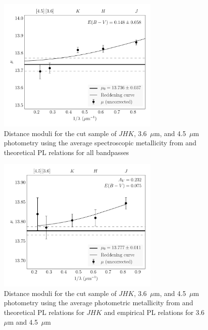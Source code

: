\documentclass[a4paper,fleqn,usenatbib]{mnras}
\begin{document}
\begin{figure}
\begin{center}
\includegraphics[width=80mm]{final_plots/multiwavelength_distance_samestars_spect_unweighted.pdf}
\caption{Distance moduli for the cut sample of $J\!H\!K$, 3.6~$\mu$m, and 4.5~$\mu$m photometry using the average spectroscopic metallicity from \citet{2006ApJ...640L..43S} and theoretical PL relations for all bandpasses}
\label{fig:omegaCen_dist_spect}
\end{center}
\end{figure}

\begin{figure}
\begin{center}
\includegraphics[width=80mm]{final_plots/multiwavelength_distance_samestars_m4.pdf}
\caption{Distance moduli for the cut sample of $J\!H\!K$, 3.6~$\mu$m, and 4.5~$\mu$m photometry using the average photometric metallicity from \citet{2006ApJ...640L..43S} and theoretical PL relations for $J\!H\!K$ and empirical PL relations for 3.6~$\mu$m and 4.5~$\mu$m}
\label{fig:omegaCen_dist_m4}
\end{center}
\end{figure}
\end{document}
